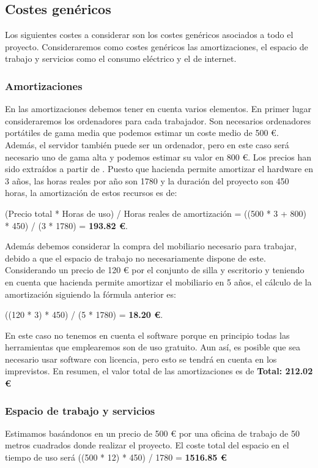 \subsection{Costes genéricos}
Los siguientes costes a considerar son los costes genéricos asociados a todo el proyecto. Consideraremos como costes genéricos las amortizaciones, el espacio de trabajo y servicios como el consumo eléctrico y el de internet.

\subsubsection*{Amortizaciones}
En las amortizaciones debemos tener en cuenta varios elementos. En primer lugar consideraremos los ordenadores para cada trabajador. Son necesarios ordenadores portátiles de gama media que podemos estimar un coste medio de 500 €. Además, el servidor también puede ser un ordenador, pero en este caso será necesario uno de gama alta y podemos estimar su valor en 800 €. Los precios han sido extraídos a partir de \cite{mediamark}. Puesto que hacienda permite amortizar el hardware en 3 años, las horas reales por año son 1780 y la duración del proyecto son 450 horas, la amortización de estos recursos es de:

(Precio total * Horas de uso) / Horas reales de amortización = ((500 * 3 + 800) * 450) / (3 * 1780) = \textbf{193.82 €}.  

Además debemos considerar la compra del mobiliario necesario para trabajar, debido a que el espacio de trabajo no necesariamente dispone de este. Considerando un precio de 120 € por el conjunto de silla y escritorio \cite{ikea} y teniendo en cuenta que hacienda permite amortizar el mobiliario en 5 años, el cálculo de la amortización siguiendo la fórmula anterior es:  

((120 * 3) * 450) / (5 * 1780) = \textbf{18.20 €}. 

En este caso no tenemos en cuenta el software porque en principio todas las herramientas que emplearemos son de uso gratuito. Aun así, es posible que sea necesario usar software con licencia, pero esto se tendrá en cuenta en los imprevistos. En resumen, el valor total de las amortizaciones es de \textbf{Total: 212.02 €}

\subsubsection*{Espacio de trabajo y servicios}
Estimamos basándonos en \cite{oficinas} un precio de 500 € por una oficina de trabajo de 50 metros cuadrados donde realizar el proyecto. El coste total del espacio en el tiempo de uso será ((500 * 12) * 450) / 1780 = \textbf{1516.85 €}  

